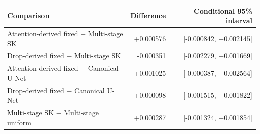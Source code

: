 \begin{tabular}{lrr}
\toprule
Comparison & Difference & Conditional 95\% interval \\
\midrule
Attention-derived fixed $-$ Multi-stage SK & +0.000576 & [-0.000842, +0.002145] \\
Drop-derived fixed $-$ Multi-stage SK & -0.000351 & [-0.002279, +0.001669] \\
Attention-derived fixed $-$ Canonical U-Net & +0.001025 & [-0.000387, +0.002564] \\
Drop-derived fixed $-$ Canonical U-Net & +0.000098 & [-0.001515, +0.001822] \\
Multi-stage SK $-$ Multi-stage uniform & +0.000287 & [-0.001324, +0.001854] \\
\bottomrule
\end{tabular}
